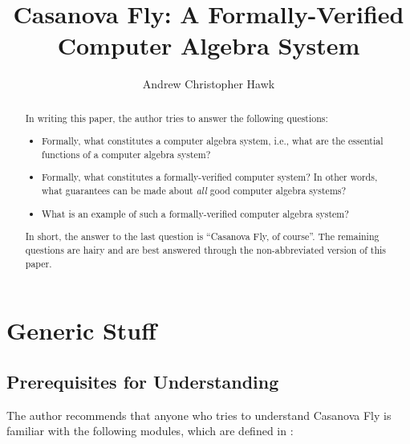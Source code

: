 \documentclass{report}
\title{Casanova Fly: A Formally-Verified Computer Algebra System}
\author{Andrew Christopher Hawk}
\begin{document}
\maketitle{}

\begin{abstract}
In writing this paper, the author tries to answer the following questions:

\begin{itemize}
  \item Formally, what constitutes a computer algebra system, i.e., what are the essential functions of a computer algebra system?
  \item Formally, what constitutes a formally-verified computer system?  In other words, what guarantees can be made about \emph{all} good computer algebra systems?
  \item What is an example of such a formally-verified computer algebra system?
\end{itemize}

In short, the answer to the last question is ``Casanova Fly, of course''.  The remaining questions are hairy and are best answered through the non-abbreviated version of this paper.
\end{abstract}

\tableofcontents

\part{Generic Stuff}

\chapter{Prerequisites for Understanding}
The author recommends that anyone who tries to understand Casanova Fly is familiar with the following modules, which are defined in \cite{The_Agda_Community_Agda_Standard_Library_2024}:
\end{document}
